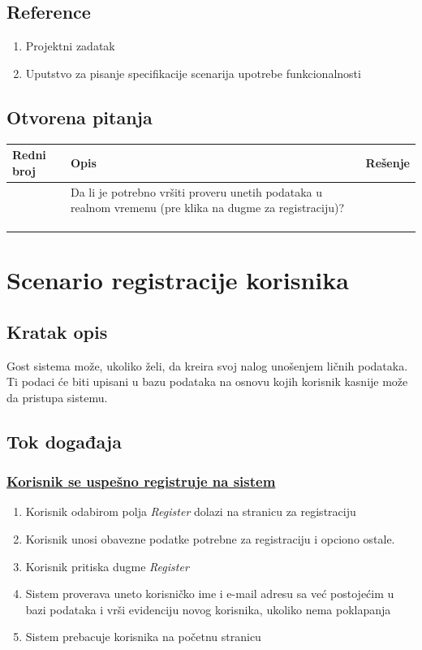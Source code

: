 \documentclass[11pt,a4paper]{article}
\begin{document}
\subsection{Reference}
\begin{enumerate}
    \item Projektni zadatak
    \item Uputstvo za pisanje specifikacije scenarija upotrebe funkcionalnosti
\end{enumerate}
\subsection{Otvorena pitanja}
\begin{center}
\begin{tabular}{| >{\centering\arraybackslash}m{1.9cm} | >{\centering\arraybackslash}m{4.9cm} | >{\centering\arraybackslash}m{4.9cm} |}
\hline
\rowcolor[HTML]{000000} 
{\color[HTML]{FFFFFF} Redni broj } & {\color[HTML]{FFFFFF} Opis } & {\color[HTML]{FFFFFF} Rešenje } \\ \hline
1 & Da li je potrebno vršiti proveru unetih podataka u realnom vremenu (pre klika na dugme za registraciju)? & \\ \hline
 &  &  \\ \hline
 &  &  \\ \hline
 &  &  \\ \hline
\end{tabular}
\end{center}

\newpage

\section{Scenario registracije korisnika}
\subsection{Kratak opis}
Gost sistema može, ukoliko želi, da kreira svoj nalog unošenjem ličnih
podataka. Ti podaci će biti upisani u bazu podataka na osnovu kojih korisnik
kasnije može da pristupa sistemu.
\subsection{Tok događaja}
\subsubsection{\underline{Korisnik se uspešno registruje na sistem}}
\begin{enumerate}
    \item Korisnik odabirom polja \textit{Register} dolazi na stranicu za registraciju
    \item Korisnik unosi obavezne podatke potrebne za registraciju i opciono ostale.
    \item Korisnik pritiska dugme \textit{Register}
    \item Sistem proverava uneto korisničko ime i e-mail adresu sa već postojećim u bazi podataka i vrši evidenciju novog korisnika, ukoliko nema poklapanja
    \item Sistem prebacuje korisnika na početnu stranicu
\end{enumerate}
\end{document}
